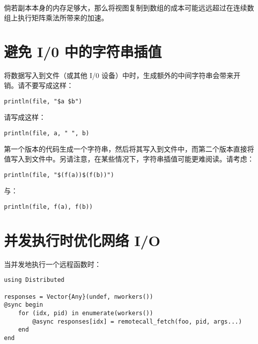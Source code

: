 倘若副本本身的内存足够大，那么将视图复制到数组的成本可能远远超过在连续数组上执行矩阵乘法所带来的加速。



\hypertarget{5580481875828136728}{}


\section{避免 I/0 中的字符串插值}



将数据写入到文件（或其他 I/0 设备）中时，生成额外的中间字符串会带来开销。请不要写成这样：




\begin{verbatim}
println(file, "$a $b")
\end{verbatim}



请写成这样：




\begin{verbatim}
println(file, a, " ", b)
\end{verbatim}



第一个版本的代码生成一个字符串，然后将其写入到文件中，而第二个版本直接将值写入到文件中。另请注意，在某些情况下，字符串插值可能更难阅读。请考虑：




\begin{verbatim}
println(file, "$(f(a))$(f(b))")
\end{verbatim}



与：




\begin{verbatim}
println(file, f(a), f(b))
\end{verbatim}



\hypertarget{612858988935113727}{}


\section{并发执行时优化网络 I/O}



当并发地执行一个远程函数时：




\begin{verbatim}
using Distributed

responses = Vector{Any}(undef, nworkers())
@sync begin
    for (idx, pid) in enumerate(workers())
        @async responses[idx] = remotecall_fetch(foo, pid, args...)
    end
end
\end{verbatim}



